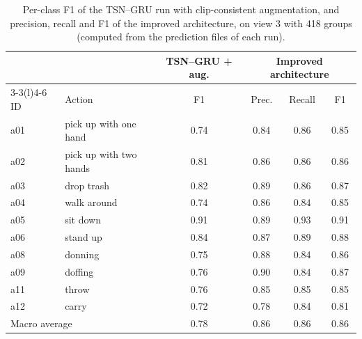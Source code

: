 \documentclass[runningheads]{llncs}
\begin{document}
\begin{table}[tb]
\caption{Per-class F1 of the TSN--GRU run with clip-consistent augmentation, and precision, recall and F1 of the improved architecture, on view 3 with 418 groups (computed from the prediction files of each run).}\label{tab:refclass}
\centering\small
\begin{tabular}{@{}llcccc@{}}
\toprule
 & & TSN--GRU + aug. & \multicolumn{3}{c}{Improved architecture}\\\cmidrule(lr){3-3}\cmidrule(l){4-6}
ID & Action & F1 & Prec. & Recall & F1\\\midrule
a01 & pick up with one hand & 0.74 & 0.84 & 0.86 & 0.85\\
a02 & pick up with two hands & 0.81 & 0.86 & 0.86 & 0.86\\
a03 & drop trash & 0.82 & 0.89 & 0.86 & 0.87\\
a04 & walk around & 0.74 & 0.86 & 0.84 & 0.85\\
a05 & sit down & 0.91 & 0.89 & 0.93 & 0.91\\
a06 & stand up & 0.84 & 0.87 & 0.89 & 0.88\\
a08 & donning & 0.75 & 0.88 & 0.84 & 0.86\\
a09 & doffing & 0.76 & 0.90 & 0.84 & 0.87\\
a11 & throw & 0.76 & 0.85 & 0.85 & 0.85\\
a12 & carry & 0.72 & 0.78 & 0.84 & 0.81\\
\midrule
\multicolumn{2}{l}{Macro average} & 0.78 & 0.86 & 0.86 & 0.86\\\bottomrule
\end{tabular}
\end{table}
\end{document}
